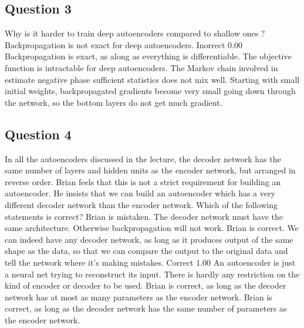 \newpage \subsection*{Question 3}
Why is it harder to train deep autoencoders compared to shallow ones ?
Backpropagation is not exact for deep autoencoders.	Inorrect	0.00	Backpropagation is exact, as along as everything is differentiable.
The objective function is intractable for deep autoencoders.			
The Markov chain involved in estimate negative phase sufficient statistics does not mix well.			
Starting with small initial weights, backpropagated gradients become very small going down through the network, so the bottom layers do not get much gradient.			
\newpage \subsection*{Question 4}
In all the autoencoders discussed in the lecture, the decoder network has the same number of layers and hidden units as the encoder network, but arranged in reverse order. Brian feels that this is not a strict requirement for building an autoencoder. He insists that we can build an autoencoder which has a very different decoder network than the encoder network. Which of the following statements is correct?
Brian is mistaken. The decoder network must have the same architecture. Otherwise backpropagation will not work.			
Brian is correct. We can indeed have any decoder network, as long as it produces output of the same shape as the data, so that we can compare the output to the original data and tell the network where it's making mistakes.	Correct	1.00	An autoencoder is just a neural net trying to reconstruct its input. There is hardly any restriction on the kind of encoder or decoder to be used.
Brian is correct, as long as the decoder network has at most as many parameters as the encoder network.			
Brian is correct, as long as the decoder network has the same number of parameters as the encoder network.			

